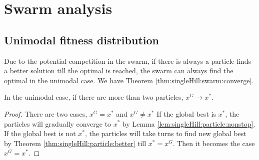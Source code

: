 \section{Swarm analysis}
\label{sec:swarm}




\subsection{Unimodal fitness distribution}

Due to the potential competition in the swarm, if there is always a particle finds a better solution till the optimal is reached, the swarm can always find the optimal in the unimodal case.
We have Theorem \ref{thm:singleHill:swarm:converge}.

\begin{mythm}
\label{thm:singleHill:swarm:converge}
In the unimodal case, if there are more than two particles, $ x^{G} \rightarrow x^{*} $.
\begin{proof}
There are two cases, $ x^{G} = x^{*} $ and $ x^{G} \not = x^{*} $
If the global best is $ x^{*} $, the particles will gradually converge to $ x^{*} $ by Lemma \ref{lem:singleHill:particle:nonstop}.
If the global best is not $ x^{*} $, the particles will take turns to find new global best by Theorem \ref{thm:singleHill:particle:better} till $ x^{*} = x^{G} $.
Then it becomes the case $ x^{G} = x^{*} $.
\end{proof}
\end{mythm}

